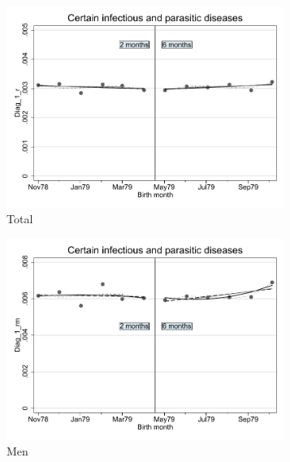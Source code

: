 \documentclass[a4paper ]{article}
\begin{document}
\begin{figure}[h]
	\centering
	\begin{subfigure}[t]{0.31\textwidth}
		\centering
		\includegraphics[width=0.99\textwidth]{R1_RD_Diag_1_r_fits}
		\caption{Total}		
	\end{subfigure}
	\begin{subfigure}[t]{0.31\textwidth}
		\centering
		\includegraphics[width=0.99\textwidth]{R1_RD_Diag_1_rm_fits}
		\caption{Men}		
	\end{subfigure}
	\quad
	\begin{subfigure}[t]{0.31\textwidth}
		\centering

\end{subfigure}
\end{figure}
\end{document}
